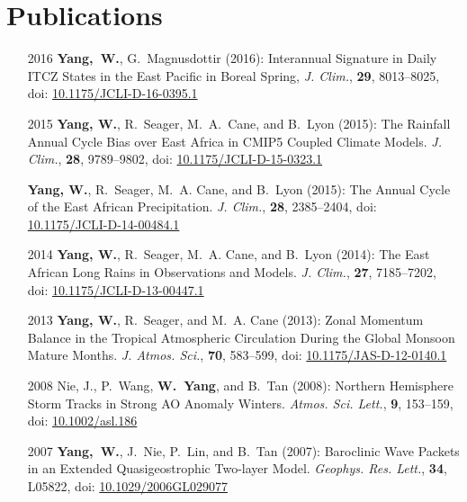 \documentclass[11pt]{article}
\newcommand{\doi}[1]{ doi: \href{https://doi.org/#1}{#1} }
\begin{document}
\section{Publications}
\begin{itemize}[leftmargin=10ex, itemsep=1ex]
	\item[2016] \textbf{Yang,~W.}, G.~Magnusdottir (2016): Interannual Signature in Daily ITCZ States in the East Pacific in Boreal Spring, \newblock \emph{J. Clim.},  \textbf{29}, 8013--8025, \doi{10.1175/JCLI-D-16-0395.1}
	
	\item[2015] \textbf{Yang, W.}, R.~Seager, M.~A.~Cane, and B.~Lyon (2015): The Rainfall Annual Cycle Bias over East Africa in CMIP5 Coupled Climate Models.
\newblock \emph{J. Clim.}, \textbf{28}, 9789--9802, \doi{10.1175/JCLI-D-15-0323.1}

	\item[] \textbf{Yang, W.}, R.~Seager, M.~A. Cane, and B.~Lyon (2015): The Annual Cycle of the
  East African Precipitation.
\newblock \emph{J. Clim.}, \textbf{28}, 2385--2404, \doi {10.1175/JCLI-D-14-00484.1}

	\item[2014] \textbf{Yang, W.}, R.~Seager, M.~A. Cane, and B.~Lyon (2014): The East African Long
  Rains in Observations and Models.
\newblock \emph{J. Clim.}, \textbf{27}, 7185--7202, \doi{10.1175/JCLI-D-13-00447.1}

	\item[2013] \textbf{Yang, W.}, R.~Seager, and M.~A. Cane (2013): Zonal Momentum Balance in the
  Tropical Atmospheric Circulation During the Global Monsoon Mature Months.
\newblock \emph{J. Atmos. Sci.}, \textbf{70}, 583--599, \doi{10.1175/JAS-D-12-0140.1}

	\item[2008] Nie, J., P.~Wang, \textbf{W.~Yang}, and B.~Tan (2008): Northern Hemisphere Storm Tracks
  in Strong AO Anomaly Winters.
\newblock \emph{Atmos. Sci. Lett.}, \textbf{9}, 153--159, \doi{10.1002/asl.186}

	\item[2007] \textbf{Yang,~W.}, J.~Nie, P.~Lin, and B.~Tan (2007): Baroclinic Wave Packets in an
  Extended Quasigeostrophic Two-layer Model.  \emph{Geophys. Res. Lett.}, \textbf{34}, L05822,  \doi{10.1029/2006GL029077}
\end{itemize}
\end{document}
